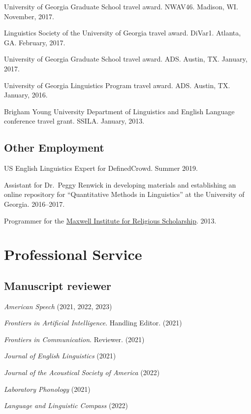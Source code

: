 \documentclass[
]{article}
\begin{document}
University of Georgia Graduate School travel award. NWAV46. Madison, WI.
November, 2017.

Linguistics Society of the University of Georgia travel award. DiVar1.
Atlanta, GA. February, 2017.

University of Georgia Graduate School travel award. ADS. Austin, TX.
January, 2017.

University of Georgia Linguistics Program travel award. ADS. Austin, TX.
January, 2016.

Brigham Young University Department of Linguistics and English Language
conference travel grant. SSILA. January, 2013.

\hypertarget{other-employment}{%
\subsection{Other Employment}\label{other-employment}}

US English Linguistics Expert for DefinedCrowd. Summer 2019.

Assistant for Dr.~Peggy Renwick in developing materials and establishing
an online repository for ``Quantitative Methods in Linguistics'' at the
University of Georgia. 2016--2017.

Programmer for the \href{http://mi.byu.edu}{Maxwell Institute for
Religious Scholarship}. 2013.

\hypertarget{professional-service}{%
\section{Professional Service}\label{professional-service}}

\hypertarget{manuscript-reviewer}{%
\subsection{Manuscript reviewer}\label{manuscript-reviewer}}

\emph{American Speech} (2021, 2022, 2023)

\emph{Frontiers in Artificial Intelligence}. Handling Editor. (2021)

\emph{Frontiers in Communication}. Reviewer. (2021)

\emph{Journal of English Linguistics} (2021)

\emph{Journal of the Acoustical Society of America} (2022)

\emph{Laboratory Phonology} (2021)

\emph{Language and Linguistic Compass} (2022)
\end{document}
